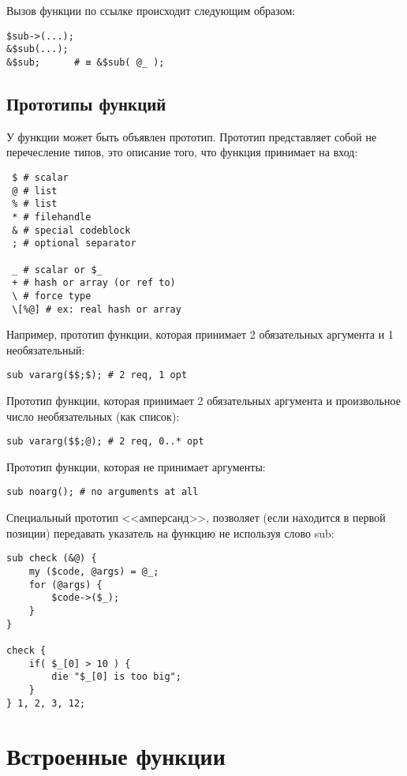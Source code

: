 Вызов функции по ссылке происходит следующим образом:
\begin{verbatim}
$sub->(...);
&$sub(...);
&$sub;      # ≡ &$sub( @_ );
\end{verbatim}

\subsection{Прототипы функций}
У функции может быть объявлен прототип. Прототип представляет собой не перечесление типов, это описание того, что функция принимает на вход:
\begin{verbatim}
 $ # scalar
 @ # list
 % # list
 * # filehandle
 & # special codeblock
 ; # optional separator

 _ # scalar or $_
 + # hash or array (or ref to)
 \ # force type
 \[%@] # ex: real hash or array
\end{verbatim}
Например, прототип функции, которая принимает 2 обязательных аргумента и 1 необязательный:
\begin{verbatim}
sub vararg($$;$); # 2 req, 1 opt
\end{verbatim}
Прототип функции, которая принимает 2 обязательных аргумента и произвольное число необязательных (как список):
\begin{verbatim}
sub vararg($$;@); # 2 req, 0..* opt
\end{verbatim}
Прототип функции, которая не принимает аргументы:
\begin{verbatim}
sub noarg(); # no arguments at all
\end{verbatim}

Специальный прототип <<амперсанд>>, позволяет (если находится в первой позиции) передавать указатель на функцию не используя слово sub:
\begin{verbatim}
sub check (&@) {
    my ($code, @args) = @_;
    for (@args) {
        $code->($_);
    }
}

check {
    if( $_[0] > 10 ) {
        die "$_[0] is too big";
    }
} 1, 2, 3, 12;
\end{verbatim}


\section{Встроенные функции}
